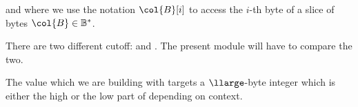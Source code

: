 and where we use the notation $\col{B}[i]$ to access the $i$-th byte of a slice of bytes $\col{B}\in\mathbb{B}^*$.

\saNote{} There are two different cutoff: \locEbsCutoff{} and \locCdsCutoff{}. The present module will have to compare the two.

\saNote{} The value which we are building with \compTrimAcc{} targets a $\llarge$-byte integer which is either the high or the low part of \locTrim{} depending on context.
